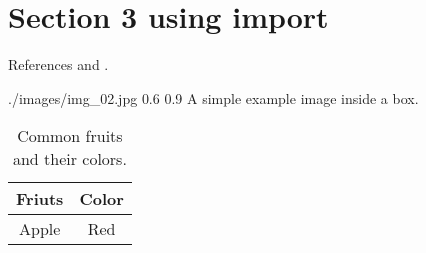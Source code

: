 
\section{Section 3 using import}
References \parencite{Ref01}  and \parencite{Ref02}.

\begin{centerBoxImageStyle}
    {./images/img_02.jpg}  %
    {0.6\linewidth}                         
    {0.9\linewidth}                         
    {A simple example image inside a box.}  
    {}               
\end{centerBoxImageStyle}


\begin{table}[h!] %
    \centering
    \begin{tabular}{|c|c|}     \hline
        Friuts & Color          \\ \hline
        Apple & Red             \\ \hline
    \end{tabular}
    \caption{Common fruits and their colors.}
\end{table}

